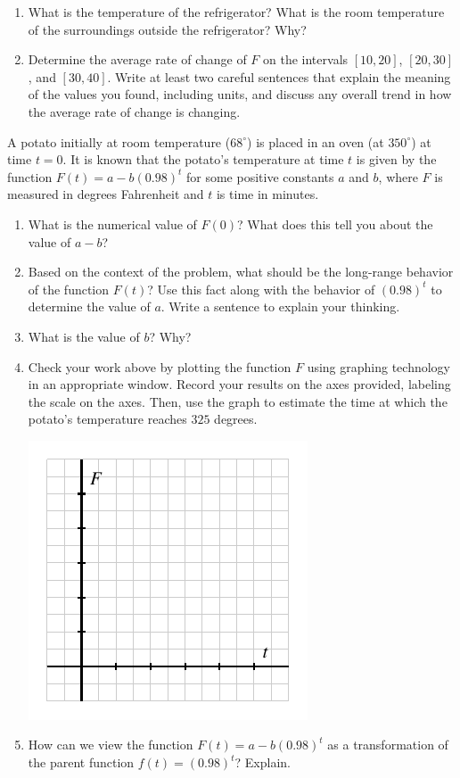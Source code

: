 \documentclass[nooutcomes]{ximera}
\begin{document}
\begin{exploration}
\begin{enumerate}[label=\alph*.]
\begin{image}
\end{image}
\item What is the temperature of the refrigerator? What is the room temperature of the surroundings outside the refrigerator? Why?
\item Determine the average rate of change of $F$ on the intervals $[10,20]$, $[20,30]$, and $[30,40]$. Write at least two careful sentences that explain the meaning of the values you found, including units, and discuss any overall trend in how the average rate of change is changing.
\end{enumerate}
\end{exploration}


\begin{exploration}
A potato initially at room temperature ($68^\circ$) is placed in an oven (at $350^\circ$) at time $t = 0$. It is known that the potato's temperature at time $t$ is given by the function $F(t) = a - b(0.98)^t$ for some positive constants $a$ and $b$, where $F$ is measured in degrees Fahrenheit and $t$ is time in minutes.

\begin{enumerate}[label=\alph*.]
\item What is the numerical value of $F(0)$? What does this tell you about the value of $a - b$?
\item Based on the context of the problem, what should be the long-range behavior of the function $F(t)$? Use this fact along with the behavior of $(0.98)^t$ to determine the value of $a$.  Write a sentence to explain your thinking.
\item What is the value of $b$?  Why?%
\item Check your work above by plotting the function $F$ using graphing technology in an appropriate window. Record your results on the axes provided, labeling the scale on the axes. Then, use the graph to estimate the time at which the potato's temperature reaches $325$ degrees.
\begin{image}
\includegraphics{modeling-F-t-blank-axes}
\end{image}
\item How can we view the function $F(t) = a - b(0.98)^t$ as a transformation of the parent function $f(t) = (0.98)^t$?  Explain.
\end{enumerate}
\end{exploration}
\end{document}
